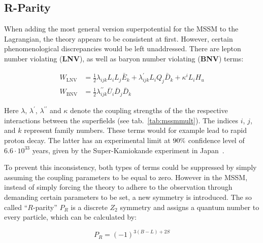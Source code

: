 \subsection{R-Parity}

When adding the most general version superpotential for the MSSM to the Lagrangian, the theory appears to be consistent at first. However, certain phenomenological discrepancies would be left unaddressed. There are lepton number violating (\textbf{LNV}), as well as baryon number violating (\textbf{BNV}) terms:


\begin{align}
  \label{eq:lnvlagr}
  W_{\text{LNV}} &= \frac{1}{2} \lambda_{ijk} L_i L_j \bar{E}_k + \lambda^\prime_{ijk} L_i Q_j \bar{D}_k + \kappa^{i} L_i H_u \\
  \label{eq:bnvlagr}
  W_{\text{BNV}} &= \frac{1}{2} \lambda^{\prime\prime}_{ijk} \bar{U}_i \bar{D}_j \bar{D}_k
\end{align}


\noindent Here $\lambda$, $\lambda^\prime$, $\lambda^{\prime\prime}$ and $\kappa$ denote the coupling strengths of the the respective interactions between the superfields (see tab.~\ref{tab:mssmmult}). The indices $i$, $j$, and $k$ represent family numbers. These terms would for example lead to rapid proton decay. The latter has an experimental limit at $90\pct$ confidence level of $6.6 \cdot 10^{33}$ years, given by the Super-Kamiokande experiment in Japan~\cite{protondecay}.

To prevent this inconsistency, both types of terms could be suppressed by simply assuming the coupling parameters to be equal to zero. However in the MSSM, instead of simply forcing the theory to adhere to the observation through demanding certain parameters to be set, a new symmetry is introduced. The so called ``$R$-parity'' $P_R$ is a discrete $Z_2$ symmetry and assigns a quantum number to every particle, which can be calculated by:

\begin{equation}
  \label{eq:rparity}
  P_R = (-1)^{3 (B-L) + 2 S}
\end{equation}

